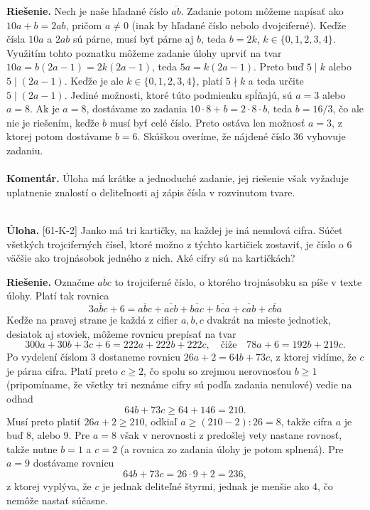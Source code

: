 \documentclass[11pt,a4paper,oneside,final]{book}
\newcommand{\kom}{\textbf{Komentár.} }
\newcommand{\ul}{\textbf{Úloha.} }
\newcommand{\rie}{\textbf{Riešenie.} }
\begin{document}
\rie Nech je naše hľadané číslo $\overline{ab}$. Zadanie potom môžeme napísať ako $10a+b=2ab$, pričom $a\neq 0$ (inak by hľadané číslo nebolo dvojciferné). Keďže čísla $10a$ a $2ab$ sú párne, musí byť párne aj $b$, teda $b=2k$, $k \in \{0,1,2,3,4\}$. Využitím tohto poznatku môžeme zadanie úlohy uprviť na tvar $10a=b(2a-1)=2k(2a-1)$, teda $5a=k(2a-1)$. Preto buď $5\mid k$ alebo $5\mid (2a-1)$. Keďže je ale $k\in \{0, 1, 2, 3, 4\}$, platí $5\nmid k$ a teda určite $5 \mid (2a-1)$. Jediné možnosti, ktoré túto podmienku spĺňajú, sú $a=3$ alebo $a=8$. Ak je $a=8$, dostávame zo zadania $10\cdot 8 +b = 2\cdot 8 \cdot b$, teda $b=16/3$, čo ale nie je riešením, keďže $b$ musí byť celé číslo. Preto ostáva len možnosť $a=3$, z ktorej potom dostávame $b=6$. Skúškou overíme, že nájdené číslo 36 vyhovuje zadaniu.\\
\\
\kom Úloha má krátke a jednoduché zadanie, jej riešenie však vyžaduje uplatnenie znalostí o deliteľnosti aj zápis čísla v rozvinutom tvare. \\
\\
\begin{tcolorbox}[breakable,notitle,boxrule=0pt,colback=light-gray,colframe=light-gray]\ul [61-K-2] Janko má tri kartičky, na každej je iná nenulová cifra. Súčet všetkých trojciferných čísel, ktoré možno z týchto kartičiek zostaviť, je číslo o 6 väčšie ako trojnásobok jedného z nich. Aké cifry sú na kartičkách?

\end{tcolorbox}

\rie Označme $\overline{abc}$ to trojciferné číslo, o ktorého trojnásobku sa píše v texte úlohy. Platí tak rovnica
$$3\overline{abc} + 6 = \overline{abc} + \overline{acb}+ \overline{bac}+\overline{bca}+\overline{cab}+\overline{cba}$$  Keďže na pravej strane je každá z cifier $a, b, c$ dvakrát na mieste jednotiek, desiatok aj
stoviek, môžeme rovnicu prepísať na tvar
$$300a + 30b + 3c + 6 = 222a + 222b + 222c, \quad \text{čiže} \quad 78a + 6 = 192b + 219c.$$
Po vydelení číslom 3 dostaneme rovnicu $26a + 2 = 64b + 73c$, z ktorej vidíme, že $c$ je párna cifra. Platí preto $c \geq 2$, čo spolu so zrejmou nerovnosťou $b \geq 1$ (pripomíname, že všetky tri neznáme cifry sú podľa zadania nenulové) vedie na odhad $$ 64b + 73c \geq 64 + 146 = 210.$$
Musí preto platiť $26a + 2 \geq 210$, odkiaľ $a \geq (210 - 2) : 26 = 8$, takže cifra $a$ je buď 8, alebo 9. Pre $a = 8$ však v nerovnosti z predošlej vety nastane rovnosť, takže nutne $b = 1$ a $c = 2$ (a rovnica zo zadania úlohy je potom splnená). Pre $a = 9$ dostávame
rovnicu $$ 64b + 73c = 26 \cdot 9 + 2 = 236,$$
z ktorej vyplýva, že $c$ je jednak deliteľné štyrmi, jednak je menšie ako 4, čo nemôže nastať súčasne.
\end{document}
